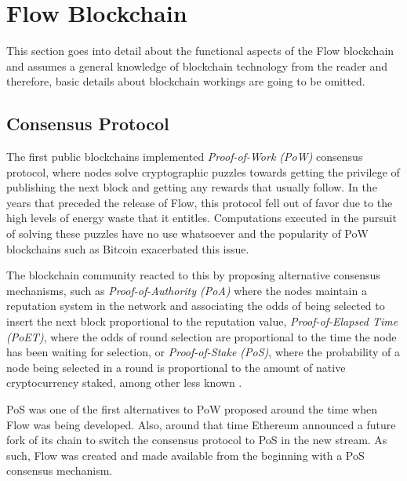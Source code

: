 \documentclass[../NFTComp_IEEE.tex]{subfiles}
\begin{document}
\section{Flow Blockchain}
\label{sec:flow_blockchain}
This section goes into detail about the functional aspects of the Flow blockchain and assumes a general knowledge of blockchain technology from the reader and therefore, basic details about blockchain workings are going to be omitted.
\par
\subsection{Consensus Protocol}
The first public blockchains implemented \textit{Proof-of-Work (PoW)} consensus protocol, where nodes solve cryptographic puzzles towards getting the privilege of publishing the next block and getting any rewards that usually follow. In the years that preceded the release of Flow, this protocol fell out of favor due to the high levels of energy waste that it entitles. Computations executed in the pursuit of solving these puzzles have no use whatsoever and the popularity of PoW blockchains such as Bitcoin exacerbated this issue.
\par
The blockchain community reacted to this by proposing alternative consensus mechanisms, such as \textit{Proof-of-Authority (PoA)} where the nodes maintain a reputation system in the network and associating the odds of being selected to insert the next block proportional to the reputation value, \textit{Proof-of-Elapsed Time (PoET)}, where the odds of round selection are proportional to the time the node has been waiting for selection, or \textit{Proof-of-Stake (PoS)}, where the probability of a node being selected in a round is proportional to the amount of native cryptocurrency staked, among other less known \cite{Bouraga2021}.
\par
PoS was one of the first alternatives to PoW proposed around the time when Flow was being developed. Also, around that time Ethereum announced a future fork of its chain to switch the consensus protocol to PoS in the new stream. As such, Flow was created and made available from the beginning with a PoS consensus mechanism.
\end{document}
